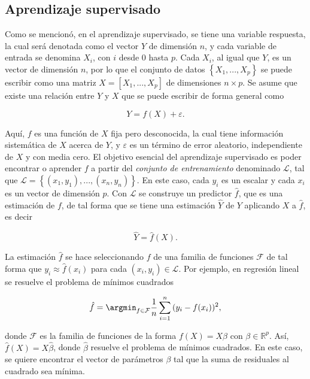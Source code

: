 \subsection{Aprendizaje supervisado}

Como se mencionó, en el aprendizaje supervisado, se tiene una variable respuesta, la cual será denotada como el vector $Y$ de dimensión $n$, y cada variable de entrada se denomina $X_i$, con $i$ desde $0$ hasta $p$. Cada $X_i$, al igual que $Y$, es un vector de dimensión $n$, por lo que el conjunto de datos $\left \{ X_1, ..., X_p \right \}$ se puede escribir como una matriz  $X = \left[ X_1, ..., X_p \right ]$ de dimensiones $n \times p$. Se asume que existe una relación entre $Y$ y $X$ que se puede escribir de forma general como

\begin{equation}
  \label{eq:modelo_gral_aprendizaje}
  Y = f(X) + \varepsilon. 
\end{equation}

Aquí, $f$ es una función de $X$ fija pero desconocida, la cual tiene información sistemática de $X$ acerca de $Y$, y $\varepsilon$ es un término de error aleatorio, independiente de $X$ y con media cero. El objetivo esencial del aprendizaje supervisado es poder encontrar o aprender $f$ a partir del \textit{conjunto de entrenamiento} denominado $\mathcal{L}$, tal que $\mathcal{L} = \left\{ (x_1, y_1), ..., (x_n, y_n) \right\}$. En este caso, cada $y_i$ es un escalar y cada $x_i$ es un vector de dimensión $p$. Con $\mathcal{L}$ se construye un predictor $\hat{f}$, que es una estimación de $f$, de tal forma que se tiene una estimación $\hat{Y}$ de $Y$ aplicando $X$ a $\hat{f}$, es decir

$$\hat{Y} = \hat{f}(X).$$

La estimación $\hat{f}$ se hace seleccionando $f$ de una familia de funciones $\mathcal{F}$ de tal forma que $y_i \approx \hat{f}(x_i)$ para cada $(x_i, y_i) \in \mathcal{L}$. Por ejemplo, en regresión lineal se resuelve el problema de mínimos cuadrados

$$\hat{f} = \argmin_{f \in \mathcal{F}} \frac{1}{n} \sum_{i = 1}^n{ ( y_i - f(x_i) ) ^ 2},$$

donde $\mathcal{F}$ es la familia de funciones de la forma $f(X) = X\beta$ con $\beta \in \mathbb{R}^p$. Así, $\hat{f}(X) = X \hat{\beta}$, donde $\hat{\beta}$ resuelve el problema de mínimos cuadrados. En este caso, se quiere encontrar el vector de parámetros $\beta$ tal que la suma de residuales al cuadrado sea mínima.

